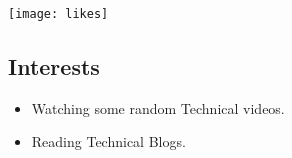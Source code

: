 \documentclass[12pt]{article}
\begin{document}
\hrulefill
\begin{figure}[!htb]
\begin{minipage}{1\textwidth}
\vspace{-0.0in}
\texttt{[image: likes]}
\vspace{-0.1in}
\subsection*{Interests}
\begin{itemize}
\item
Watching some random Technical videos.
\item 
Reading Technical Blogs.
\end{itemize}
\end{minipage}


\end{figure}
\end{document}
